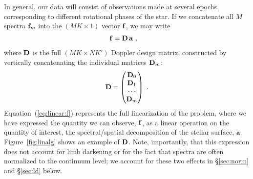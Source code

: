 \documentclass[modern]{aastex631}
\begin{document}
In general, our data will consist of observations made at several epochs, corresponding to different rotational phases of the star.
If we concatenate all $M$ spectra ${\mathbf{f}}_m$ into the $(MK \times 1)$ vector ${\mathbf{f}}$, we may write
%
\begin{align}
    \label{eq:linear:f}
    {\ensuremath{\mathbf{f}}}
     & =
    {\mathbf{D}}
    \,
    {\mathbf{a}}
    \hskip 0.33em,
\end{align}
%
where ${\mathbf{D}}$ is the full $(MK \times N K')$ Doppler design matrix, constructed by vertically concatenating the individual matrices ${\mathbf{D}}_m$:
%
%
\begin{align}
    \label{eq:linear:D}
    {\ensuremath{\mathbf{D}}} =
    \begin{pmatrix}
        {\ensuremath{\mathbf{D}}}_0
        \\
        {\mathbf{D}}_1
        \\
        \cdots
        \\
        {\mathbf{D}}_m
    \end{pmatrix}
    \hskip 0.33em.
\end{align}
%
%
Equation~(\ref{eq:linear:f}) represents the full linearization of the problem, where we have expressed the quantity we can observe, ${\mathbf{f}}$, as a linear operation on the quantity of interest, the spectral/spatial decomposition of the stellar surface, ${\mathbf{a}}$. 
Figure~\ref{fig:linalg} shows an example of ${\mathbf{D}}$.
Note, importantly, that this expression does not account for limb darkening or for the fact that spectra are often normalized to the continuum level; we account for these two effects in \S\ref{sec:norm} and \S\ref{sec:ld} below.
\end{document}

